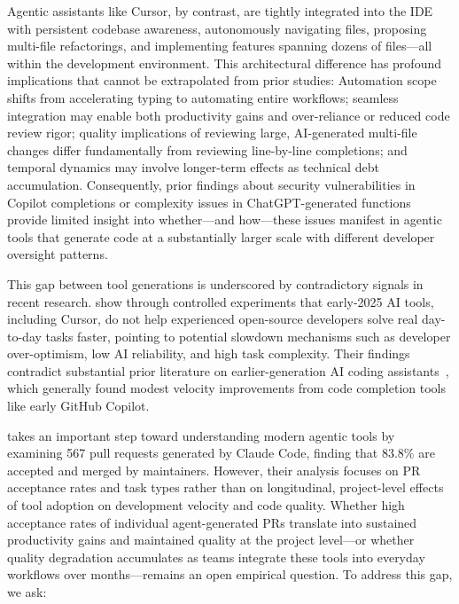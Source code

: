Agentic assistants like Cursor, by contrast, are tightly integrated into the IDE with persistent codebase awareness, autonomously navigating files, proposing multi-file refactorings, and implementing features spanning dozens of files---all within the development environment.
This architectural difference has profound implications that cannot be extrapolated from prior studies:
Automation scope shifts from accelerating typing to automating entire workflows; seamless integration may enable both productivity gains and over-reliance or reduced code review rigor; quality implications of reviewing large, AI-generated multi-file changes differ fundamentally from reviewing line-by-line completions; and temporal dynamics may involve longer-term effects as technical debt accumulation. 
Consequently, prior findings about security vulnerabilities in Copilot completions or complexity issues in ChatGPT-generated functions provide limited insight into whether---and how---these issues manifest in agentic tools that generate code at a substantially larger scale with different developer oversight patterns.

This gap between tool generations is underscored by contradictory signals in recent research.
\citet{DBLP:journals/corr/abs-2507-09089} show through controlled experiments that early-2025 AI tools, including Cursor, do not help experienced open-source developers solve real day-to-day tasks faster, pointing to potential slowdown mechanisms such as developer over-optimism, low AI reliability, and high task complexity.
Their findings contradict substantial prior literature on earlier-generation AI coding assistants~\cite{DBLP:conf/pldi/0001KLRRSSA22, DBLP:conf/chi/Vaithilingam0G22, DBLP:conf/icse/Imai22, dohmke2023sea, DBLP:journals/corr/abs-2302-06590, hoffmann2024generative, DBLP:conf/icis/YeverechyahuMO24, DBLP:journals/corr/abs-2410-02091, cui2025effects, DBLP:journals/corr/abs-2406-17910, stray2025developer}, which generally found modest velocity improvements from code completion tools like early GitHub Copilot.

\citet{watanabe2025use} takes an important step toward understanding modern agentic tools by examining 567 pull requests generated by Claude Code, finding that 83.8\% are accepted and merged by maintainers.
However, their analysis focuses on PR acceptance rates and task types rather than on longitudinal, project-level effects of tool adoption on development velocity and code quality.
Whether high acceptance rates of individual agent-generated PRs translate into sustained productivity gains and maintained quality at the project level---or whether quality degradation accumulates as teams integrate these tools into everyday workflows over months---remains an open empirical question.
To address this gap, we ask:

